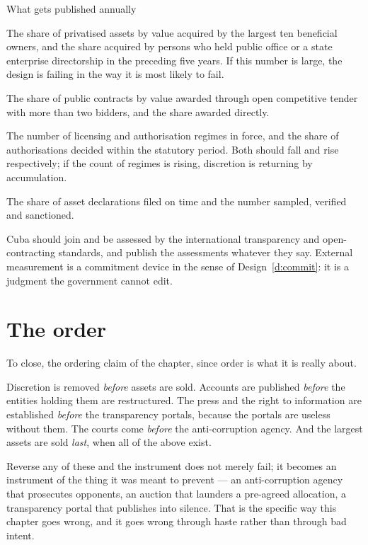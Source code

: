 \begin{design}{What gets published annually}
\label{d:measure}
\begin{rules}
 The share of privatised assets by value acquired by the
largest ten beneficial owners, and the share acquired by persons who held public
office or a state enterprise directorship in the preceding five years. If this
number is large, the design is failing in the way it is most likely to fail.

 The share of public contracts by value awarded through open
competitive tender with more than two bidders, and the share awarded directly.

 The number of licensing and authorisation regimes in force, and
the share of authorisations decided within the statutory period. Both should fall
and rise respectively; if the count of regimes is rising, discretion is returning
by accumulation.

 The share of asset declarations filed on time and the number
sampled, verified and sanctioned.

 Cuba should join and be assessed by the
international transparency and open-contracting standards, and publish the
assessments whatever they say. External measurement is a commitment device in
the sense of Design~\ref{d:commit}: it is a judgment the government cannot
edit.
\end{rules}
\end{design}

\section{The order}

To close, the ordering claim of the chapter, since order is what it is really
about.

Discretion is removed \emph{before} assets are sold. Accounts are published
\emph{before} the entities holding them are restructured. The press and the right
to information are established \emph{before} the transparency portals, because
the portals are useless without them. The courts come \emph{before} the
anti-corruption agency. And the largest assets are sold \emph{last}, when all of
the above exist.

Reverse any of these and the instrument does not merely fail; it becomes an
instrument of the thing it was meant to prevent --- an anti-corruption agency
that prosecutes opponents, an auction that launders a pre-agreed allocation, a
transparency portal that publishes into silence. That is the specific way this
chapter goes wrong, and it goes wrong through haste rather than through bad
intent.
